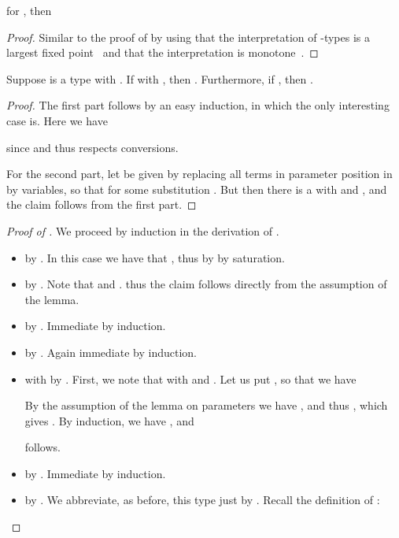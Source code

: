 \documentclass[preprint]{sigplanconf}
\begin{document}
\begin{definition}
\begin{figure*}
\begin{lemma}
  for ,
  then
  
\end{lemma}
\begin{proof}
  Similar to the proof of  by using that
  the interpretation of -types is a largest fixed
  point~ and that the interpretation is
  monotone~.
\end{proof}

\begin{lemma}
  \label{lem:interpret-resp-reduction}
  Suppose  is a type with .
  If   with
  , then
  .
  Furthermore, if , then .
\end{lemma}
\begin{proof}
  The first part follows by an easy induction, in which the only interesting
  case  is.
  Here we have
  
  since  and thus respects conversions.

  For the second part, let  be given by replacing all terms in parameter
  position in  by variables, so that  for some substitution
  .
  But then there is a  with  and ,
  and the claim follows from the first part.
\end{proof}

\begin{proof}[Proof of ]
  We proceed by induction in the derivation of
  .
  \begin{itemize}
  \item  by \TTyI.
    In this case we have that ,
    thus  by
    by saturation.
  \item  by \TyVarI.
    Note that
     and
    .
    thus the claim follows directly from the assumption of the lemma.
  \item 
    by \TyVarWeak.
    Immediate by induction.
  \item  by \TyWeak.
    Again immediate by induction.
  \item  with
     by \TyInst.
    First, we note that  with
     and
    .
    Let us put ,
    so that we have
    
    By the assumption of the lemma on parameters we have
    , and thus
    ,
    which gives
    .
    By induction, we have
    ,
    and
    
    follows.
  \item 
    by \PAbstr.
    Immediate by induction.
  \item 
    by \FPTy.
    We abbreviate, as before, this type just by .
    Recall the definition of :
    

\end{itemize}
\end{proof}
\end{figure*}
\end{definition}
\end{document}
